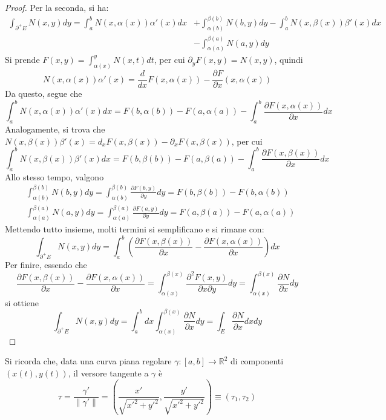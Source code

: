 \documentclass[10pt, a4paper]{scrartcl}
\theoremstyle{definition}
\numberwithin{esempio}{section}
\theoremstyle{definition}
\numberwithin{obs}{section}
\numberwithin{nota}{section}
\numberwithin{equation}{subsection}
\begin{document}
\begin{teorema}
\begin{proof}
Per la seconda, si ha:
\[
	\begin{split}
		\int_{\partial ^+ E} N(x,y) dy = \int_{a} ^b N(x,\alpha (x)) \alpha '(x) dx &+ \int_{\alpha (b)} ^{\beta (b)} N(b,y)  dy - \int_{a} ^b N(x,\beta (x)) \beta '(x) dx\\
											    &- \int_{\alpha (a)} ^{\beta (a)} N(a,y) dy
	\end{split}
\] 
Si prende $F(x,y) = \int_{\alpha (x)} ^{y} N(x,t) dt$, per cui $\partial _y F(x,y) = N(x,y)$, quindi
\[
N(x,\alpha (x)) \alpha '(x) = \frac{d }{d x} F(x,\alpha (x)) - \frac{\partial F}{\partial x} (x,\alpha (x))
\] 
Da questo, segue che
\[
\int_{a} ^b N(x,\alpha (x)) \alpha '(x) dx = F(b,\alpha (b)) - F(a,\alpha (a)) - \int_{a} ^b \frac{\partial F(x,\alpha (x))}{\partial x}  dx
\] 
Analogamente, si trova che $N(x,\beta (x)) \beta '(x) = d_x F(x,\beta (x)) - \partial _x F(x,\beta (x))$, per cui
\[
\int_{a} ^b N(x,\beta (x)) \beta '(x) dx = F(b,\beta (b)) - F(a,\beta (a)) - \int_{a} ^b \frac{\partial F(x,\beta (x))}{\partial x} dx
\] 
Allo stesso tempo, valgono
\[
\begin{split}
	&\int_{\alpha (b)} ^{\beta (b)} N(b,y) dy = \int_{\alpha (b)} ^{\beta (b)} \frac{\partial F(b,y)}{\partial y} dy = F(b,\beta (b)) - F(b,\alpha (b))\\
	& \int_{\alpha (a)} ^{\beta (a)} N(a,y) dy = \int_{\alpha (a)} ^{\beta (a)} \frac{\partial F(a,y)}{\partial y} dy = F(a,\beta (a)) - F(a,\alpha (a))
\end{split}
\] 
Mettendo tutto insieme, molti termini si semplificano e si rimane con:
\[
\int_{\partial ^+ E} N(x,y) dy = \int_{a} ^b \left(\frac{\partial F(x,\beta (x))}{\partial x}-\frac{\partial F(x,\alpha (x))}{\partial x}  \right) dx
\] 
Per finire, essendo che
\[
\frac{\partial F(x,\beta (x))}{\partial x}-\frac{\partial F(x,\alpha (x))}{\partial x} = \int_{\alpha (x)} ^{\beta (x)} \frac{\partial ^2F(x,y)}{\partial x\partial y} dy = \int_{\alpha (x)} ^{\beta (x)} \frac{\partial N}{\partial x} dy
\] 
si ottiene
\[
\int_{\partial ^+E} N(x,y) dy = \int_{a} ^b dx \int_{\alpha (x)} ^{\beta (x)} \frac{\partial N}{\partial x} dy=\int_{E} \frac{\partial N}{\partial x} dxdy
\] 
\end{proof}
\end{teorema}
Si ricorda che, data una curva piana regolare $\gamma:\left[ a,b \right] \to \mathbb{R}^2$ di componenti $(x(t), y(t))$, il versore tangente a $\gamma$ \`e
\[
\tau = \frac{\gamma'}{\left\lVert \gamma' \right\rVert } = \left(\frac{x'}{\sqrt{x'^2 + y'^2} }, \frac{y'}{\sqrt{x'^2 + y'^2} }\right) \equiv (\tau _1, \tau _2)
\] 
\end{document}
